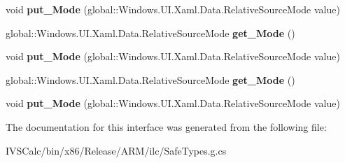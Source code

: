 \begin{DoxyCompactItemize}
\item 
\mbox{\label{interface_windows_1_1_u_i_1_1_xaml_1_1_data_1_1_i_relative_source_abaa2d21450656189e0736176d6752b01}} 
void {\bfseries put\+\_\+\+Mode} (global\+::\+Windows.\+U\+I.\+Xaml.\+Data.\+Relative\+Source\+Mode value)
\item 
\mbox{\label{interface_windows_1_1_u_i_1_1_xaml_1_1_data_1_1_i_relative_source_a03f6131f8e2b0d5d3a88a35b83713113}} 
global\+::\+Windows.\+U\+I.\+Xaml.\+Data.\+Relative\+Source\+Mode {\bfseries get\+\_\+\+Mode} ()
\item 
\mbox{\label{interface_windows_1_1_u_i_1_1_xaml_1_1_data_1_1_i_relative_source_abaa2d21450656189e0736176d6752b01}} 
void {\bfseries put\+\_\+\+Mode} (global\+::\+Windows.\+U\+I.\+Xaml.\+Data.\+Relative\+Source\+Mode value)
\item 
\mbox{\label{interface_windows_1_1_u_i_1_1_xaml_1_1_data_1_1_i_relative_source_a03f6131f8e2b0d5d3a88a35b83713113}} 
global\+::\+Windows.\+U\+I.\+Xaml.\+Data.\+Relative\+Source\+Mode {\bfseries get\+\_\+\+Mode} ()
\item 
\mbox{\label{interface_windows_1_1_u_i_1_1_xaml_1_1_data_1_1_i_relative_source_abaa2d21450656189e0736176d6752b01}} 
void {\bfseries put\+\_\+\+Mode} (global\+::\+Windows.\+U\+I.\+Xaml.\+Data.\+Relative\+Source\+Mode value)
\end{DoxyCompactItemize}


The documentation for this interface was generated from the following file\+:\begin{DoxyCompactItemize}
\item 
I\+V\+S\+Calc/bin/x86/\+Release/\+A\+R\+M/ilc/Safe\+Types.\+g.\+cs\end{DoxyCompactItemize}

